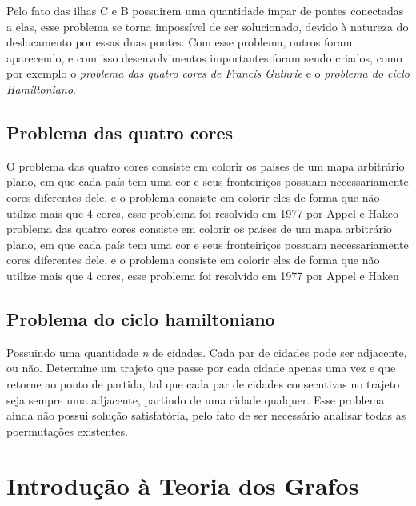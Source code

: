 \documentclass[12pt a4paper]{paper}
\begin{document}
Pelo fato das ilhas C e B possuirem uma quantidade ímpar de pontes conectadas a elas, esse problema se torna impossível de ser solucionado, devido à natureza do deslocamento por essas duas pontes.
Com esse problema, outros foram aparecendo, e com isso desenvolvimentos importantes foram sendo criados, como por exemplo o \textit{problema das quatro cores de Francis Guthrie} e o \textit{problema do ciclo Hamiltoniano}.

\subsection{Problema das quatro cores}
O problema das quatro cores consiste em colorir os países de um mapa arbitrário plano, em que cada país tem uma cor e seus fronteiriços possuam necessariamente cores diferentes dele, e o problema consiste em colorir eles de forma que não utilize mais que 4 cores, esse problema foi resolvido em 1977 por Appel e Hakeo problema das quatro cores consiste em colorir os países de um mapa arbitrário plano, em que cada país tem uma cor e seus fronteiriços possuam necessariamente cores diferentes dele, e o problema consiste em colorir eles de forma que não utilize mais que 4 cores, esse problema foi resolvido em 1977 por Appel e Haken

\subsection{Problema do ciclo hamiltoniano}
Possuindo uma quantidade \textit{n} de cidades. Cada par de cidades pode ser adjacente, ou não. Determine um trajeto que passe por cada cidade apenas uma vez e que retorne ao ponto de partida, tal que cada par de cidades consecutivas no trajeto seja sempre uma adjacente, partindo de uma cidade qualquer.
Esse problema ainda não possui solução satisfatória, pelo fato de ser necessário analisar todas as poermutações existentes.

\section{Introdução à Teoria dos Grafos}
\end{document}
